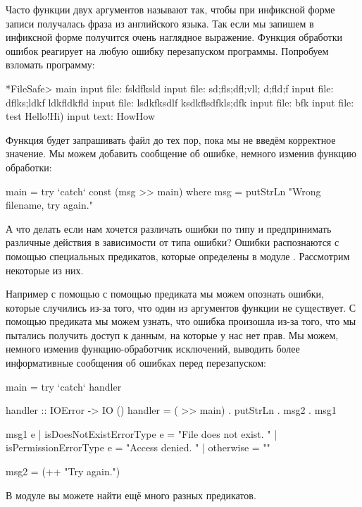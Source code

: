 Часто функции двух аргументов называют так, чтобы при инфиксной форме
записи получалась фраза из английского языка. Так если мы запишем
 в инфиксной форме получится очень наглядное выражение.
Функция обработки ошибок реагирует на любую ошибку перезапуском
программы. Попробуем взломать программу:


\begin{code}
*FileSafe> main
input file: fsldfksld
input file: sd;fls;dfl;vll; d;fld;f
input file: dflks;ldkf ldkfldkfld
input file: lsdkfksdlf ksdkflsdfkls;dfk
input file: bfk
input file: test
Hello!Hi)
input text: HowHow
\end{code}

Функция будет запрашивать файл до тех пор, пока мы не введём корректное
значение. Мы можем добавить сообщение об ошибке, немного изменив функцию
обработки:


\begin{code}
main = try `catch` const (msg >> main)
    where msg = putStrLn "Wrong filename, try again."
\end{code}

А что делать если нам хочется различать ошибки по типу и предпринимать
различные действия в зависимости от типа ошибки? Ошибки распознаются с
помощью специальных предикатов, которые определены в модуле
. Рассмотрим некоторые из них.

Например с помощью с помощью предиката  мы
можем опознать ошибки, которые случились из-за того, что один из
аргументов функции не существует. С помощью предиката
 мы можем узнать, что ошибка произошла из-за
того, что мы пытались получить доступ к данным, на которые у нас нет
прав. Мы можем, немного изменив функцию-обработчик исключений, выводить
более информативные сообщения об ошибках перед перезапуском:


\begin{code}
main = try `catch` handler

handler :: IOError -> IO ()
handler = ( >> main) . putStrLn . msg2 . msg1

msg1 e 
    | isDoesNotExistErrorType e = "File does not exist. "
    | isPermissionErrorType e   = "Access denied. "
    | otherwise                 = ""

msg2 = (++ "Try again.")
\end{code}

В модуле  вы можете найти ещё много разных
предикатов.

